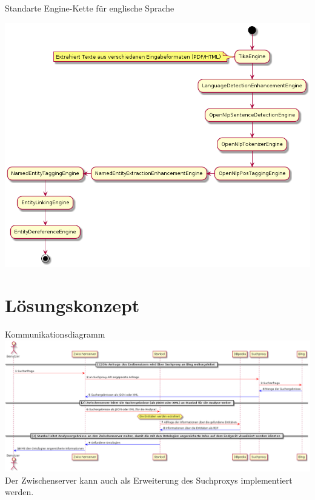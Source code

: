 \documentclass{beamer}
\begin{document}
  \begin{frame}[c]{Standarte Engine-Kette für englische Sprache}
  \begin{center}
  \includegraphics[width=0.7\linewidth]{diagramms/enchancer.png}
  \end{center}
  \end{frame}
  
  \section{Lösungskonzept}
  \begin{frame}[c]{Kommunikationsdiagramm}
  \includegraphics[width=0.94\linewidth]{diagramms/kommunikation.png}\\
  Der Zwischenserver kann auch als Erweiterung des Suchproxys implementiert werden.
  \end{frame}
  
\end{document}
